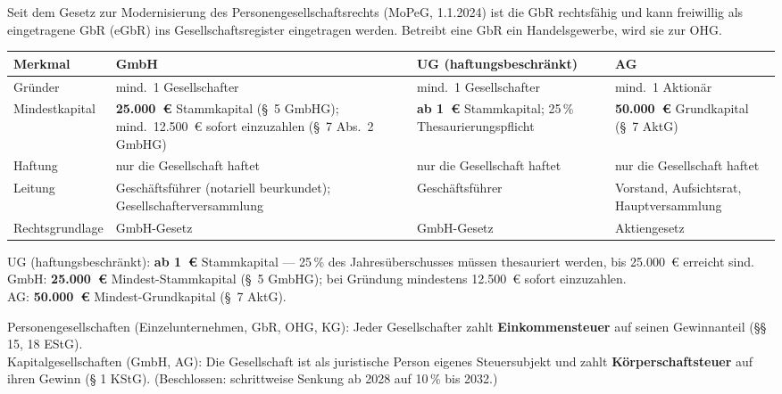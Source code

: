 \documentclass[11pt, a4paper]{article}
\begin{document}
\begin{merksatz}[title={\bfseries Merke: GbR und MoPeG (seit 1.1.2024)}]
Seit dem Gesetz zur Modernisierung des Personengesellschaftsrechts (MoPeG, 1.1.2024) ist die
GbR rechtsfähig und kann freiwillig als eingetragene GbR (eGbR) ins Gesellschaftsregister
eingetragen werden. Betreibt eine GbR ein Handelsgewerbe, wird sie zur OHG.
\end{merksatz}

\begin{center}
\begin{tabular}{p{2.2cm} p{3.5cm} p{4cm} p{3cm}}
\toprule
\textbf{Merkmal} & \textbf{GmbH} & \textbf{UG (haftungsbeschränkt)} & \textbf{AG}\\
\midrule
Gründer & mind.\ 1 Gesellschafter & mind.\ 1 Gesellschafter & mind.\ 1 Aktionär\\
Mindestkapital & \textbf{25.000~€} Stammkapital (§~5 GmbHG); mind.\ 12.500~€ sofort einzuzahlen (§~7 Abs.~2 GmbHG) & \textbf{ab 1~€} Stammkapital; 25\,\% Thesaurierungspflicht & \textbf{50.000~€} Grundkapital (§~7 AktG)\\
Haftung & nur die Gesellschaft haftet & nur die Gesellschaft haftet & nur die Gesellschaft haftet\\
Leitung & Geschäftsführer (notariell beurkundet); Gesellschafterversammlung & Geschäftsführer & Vorstand, Aufsichtsrat, Hauptversammlung\\
Rechtsgrundlage & GmbH-Gesetz & GmbH-Gesetz & Aktiengesetz\\
\bottomrule
\end{tabular}
\end{center}

\begin{merksatz}[title={\bfseries Merke: Mindestkapital der Kapitalgesellschaften}]
UG (haftungsbeschränkt): \textbf{ab 1~€} Stammkapital --- 25\,\% des Jahresüberschusses
müssen thesauriert werden, bis 25.000~€ erreicht sind.\\[0.3em]
GmbH: \textbf{25.000~€} Mindest-Stammkapital (§~5 GmbHG); bei Gründung mindestens
12.500~€ sofort einzuzahlen.\\[0.3em]
AG: \textbf{50.000~€} Mindest-Grundkapital (§~7 AktG).
\end{merksatz}

\begin{merksatz}[title={\bfseries Steuerliche Einordnung}]
Personengesellschaften (Einzelunternehmen, GbR, OHG, KG): Jeder Gesellschafter zahlt
\textbf{Einkommensteuer} auf seinen Gewinnanteil (§§ 15, 18 EStG).\\[0.3em]
Kapitalgesellschaften (GmbH, AG): Die Gesellschaft ist als juristische Person eigenes
Steuersubjekt und zahlt \textbf{Körperschaftsteuer} auf ihren Gewinn (§ 1 KStG).
(Beschlossen: schrittweise Senkung ab 2028 auf 10\,\% bis 2032.)
\end{merksatz}
\end{document}
